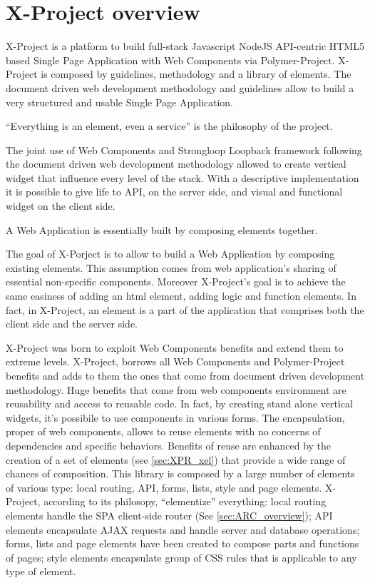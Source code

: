 \section{X-Project overview}
\label{sec:XPR_xpr}

X-Project is a platform to build full-stack Javascript NodeJS API-centric HTML5 based Single Page Application with Web Components via Polymer-Project.
X-Project is composed by guidelines, methodology and a library of elements.
The document driven web development methodology and guidelines allow to build a very structured and usable Single Page Application.

``Everything is an element, even a service'' is the philosophy of the project.

The joint use of Web Components and Strongloop Loopback framework following the document driven web development methodology allowed to create vertical widget that influence every level of the stack. With a descriptive implementation it is possible to give life to API, on the server side, and visual and functional widget on the client side.

A Web Application is essentially built by composing elements together.

The goal of X-Porject is to allow to build a Web Application by composing existing elements. This assumption comes from web application's sharing of essential non-specific components.
Moreover X-Project's goal is to achieve the same easiness of adding an html element, adding logic and function elements.
In fact, in X-Project, an element is a part of the application that comprises both the client side and the server side.

X-Project was born to exploit Web Components benefits and extend them to extreme levels. X-Project, borrows all Web Components and Polymer-Project benefits and adds to them the ones that come from document driven development methodology.
Huge benefits that come from web components environment are reusability and access to reusable code. In fact, by creating stand alone vertical widgets, it's possibile to use components in various forms.
The encapsulation, proper of web components, allows to reuse elements with no concerns of dependencies and specific behaviors.
Benefits of reuse are enhanced by the creation of a set of elements (see \ref{sec:XPR_xel}) that provide a wide range of chances of composition.
This library is composed by a large number of elements of various type: local routing, API, forms, lists, style and page elements. X-Project, according to its philosopy, ``elementize'' everything: local routing elements handle the SPA client-side router (See \ref{sec:ARC_overview}); API elements encapsulate AJAX requests and handle server and database operations; forms, lists and page elements have been created to compose parts and functions of pages; style elements encapsulate group of CSS rules that is applicable to any type of element.


